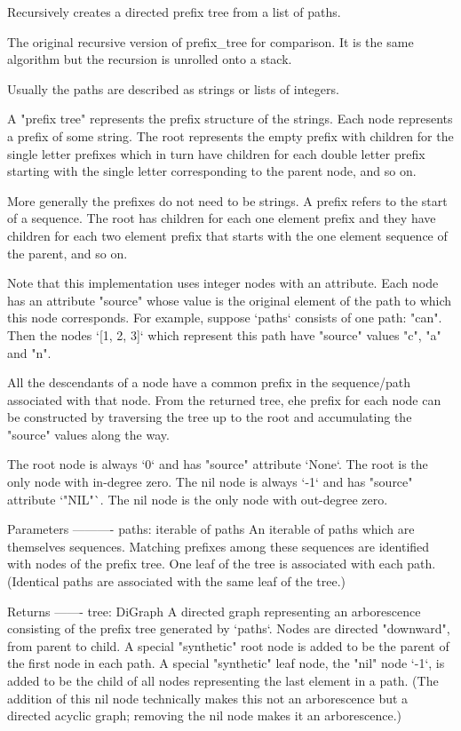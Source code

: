 \begin{DoxyVerb}Recursively creates a directed prefix tree from a list of paths.

The original recursive version of prefix_tree for comparison. It is
the same algorithm but the recursion is unrolled onto a stack.

Usually the paths are described as strings or lists of integers.

A "prefix tree" represents the prefix structure of the strings.
Each node represents a prefix of some string. The root represents
the empty prefix with children for the single letter prefixes which
in turn have children for each double letter prefix starting with
the single letter corresponding to the parent node, and so on.

More generally the prefixes do not need to be strings. A prefix refers
to the start of a sequence. The root has children for each one element
prefix and they have children for each two element prefix that starts
with the one element sequence of the parent, and so on.

Note that this implementation uses integer nodes with an attribute.
Each node has an attribute "source" whose value is the original element
of the path to which this node corresponds. For example, suppose `paths`
consists of one path: "can". Then the nodes `[1, 2, 3]` which represent
this path have "source" values "c", "a" and "n".

All the descendants of a node have a common prefix in the sequence/path
associated with that node. From the returned tree, ehe prefix for each
node can be constructed by traversing the tree up to the root and
accumulating the "source" values along the way.

The root node is always `0` and has "source" attribute `None`.
The root is the only node with in-degree zero.
The nil node is always `-1` and has "source" attribute `"NIL"`.
The nil node is the only node with out-degree zero.


Parameters
----------
paths: iterable of paths
    An iterable of paths which are themselves sequences.
    Matching prefixes among these sequences are identified with
    nodes of the prefix tree. One leaf of the tree is associated
    with each path. (Identical paths are associated with the same
    leaf of the tree.)


Returns
-------
tree: DiGraph
    A directed graph representing an arborescence consisting of the
    prefix tree generated by `paths`. Nodes are directed "downward",
    from parent to child. A special "synthetic" root node is added
    to be the parent of the first node in each path. A special
    "synthetic" leaf node, the "nil" node `-1`, is added to be the child
    of all nodes representing the last element in a path. (The
    addition of this nil node technically makes this not an
    arborescence but a directed acyclic graph; removing the nil node
    makes it an arborescence.)



\end{DoxyVerb}
